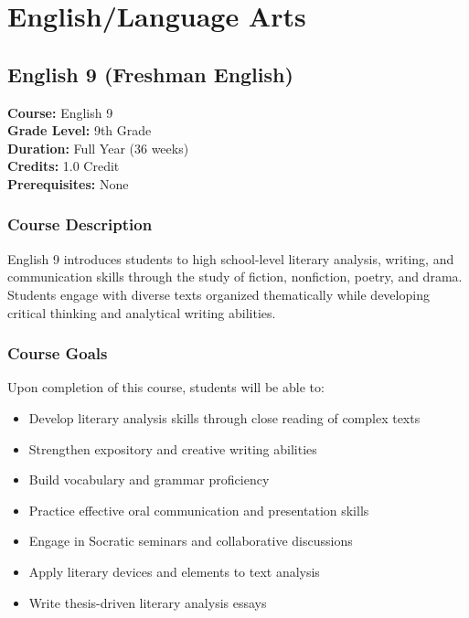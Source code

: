 \documentclass[12pt,oneside]{book}
\begin{document}
\mainmatter

\part{English/Language Arts}

\chapter{English 9 (Freshman English)}

\noindent\textbf{Course:} English 9\\
\textbf{Grade Level:} 9th Grade\\
\textbf{Duration:} Full Year (36 weeks)\\
\textbf{Credits:} 1.0 Credit\\
\textbf{Prerequisites:} None

\section{Course Description}
English 9 introduces students to high school-level literary analysis, writing, and communication
skills through the study of fiction, nonfiction, poetry, and drama. Students engage with diverse
texts organized thematically while developing critical thinking and analytical writing abilities.

\section{Course Goals}
Upon completion of this course, students will be able to:
\begin{itemize}[leftmargin=2em]
    \item Develop literary analysis skills through close reading of complex texts
    \item Strengthen expository and creative writing abilities
    \item Build vocabulary and grammar proficiency
    \item Practice effective oral communication and presentation skills
    \item Engage in Socratic seminars and collaborative discussions
    \item Apply literary devices and elements to text analysis
    \item Write thesis-driven literary analysis essays
\end{itemize}
\end{document}
